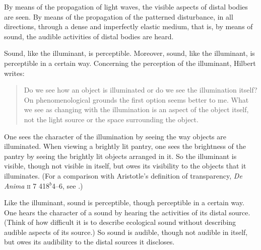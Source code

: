 By means of the propagation of light waves, the visible aspects of distal bodies are seen. By means of the propagation of the patterned disturbance, in all directions, through a dense and imperfectly elastic medium, that is, by means of sound, the audible activities of distal bodies are heard.

Sound, like the illuminant, is perceptible. Moreover, sound, like the illuminant, is perceptible in a certain way. Concerning the perception of the illuminant, Hilbert writes:
\begin{quote}
	Do we see how an object is illuminated or do we see the illumination itself? On phenomenological grounds the first option seems better to me. What we see as changing with the illumination is an aspect of the object itself, not the light source or the space surrounding the object. \citep[150--151]{Hilbert:2007qy}
\end{quote}
One sees the character of the illumination by seeing the way objects are illuminated. When viewing a brightly lit pantry, one sees the brightness of the pantry by seeing the brightly lit objects arranged in it. So the illuminant is visible, though not visible in itself, but owes its visibility to the objects that it illuminates. (For a comparison with Aristotle's definition of transparency, \emph{De Anima} \textsc{ii} 7 418\( ^{b} \)4--6, see \citealt[41--42]{Kalderon:2015fr}.)

Like the illuminant, sound is perceptible, though perceptible in a certain way. One hears the character of a sound by hearing the activities of its distal source. (Think of how difficult it is to describe ecological sound without describing audible aspects of its source.) So sound is audible, though not audible in itself, but owes its audibility to the distal sources it discloses.


